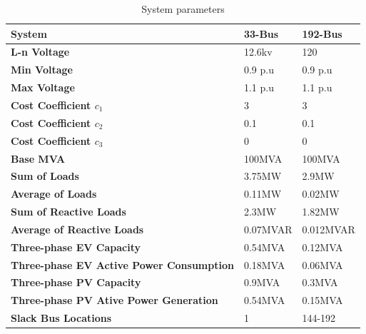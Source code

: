 \documentclass[journal]{IEEEtran}
\begin{document}
\begin{table}
\begin{center}
\caption{System parameters}
\label{table2}
\begin{tabular}{ |p{3.5cm}|p{2cm}|p{2cm}| }
\hline
 \textbf{System} & \textbf{33-Bus} & \textbf{192-Bus} \\ 
 \hline\hline
 \textbf{L-n Voltage} & 12.6kv & 120 \\
 \hline
 \textbf{Min Voltage} & 0.9 p.u & 0.9 p.u\\
 \hline
 \textbf{Max Voltage} & 1.1 p.u & 1.1 p.u\\
 \hline
 \textbf{Cost Coefficient $c_{1}$} & 3 & 3 \\
 \hline
 \textbf{Cost Coefficient $c_{2}$} & 0.1 & 0.1 \\
 \hline
 \textbf{Cost Coefficient $c_{3}$} & 0 & 0 \\
 \hline
 \textbf{Base MVA} & 100MVA & 100MVA \\
 \hline
 \textbf{Sum of Loads} & 3.75MW & 2.9MW \\
 \hline
 \textbf{Average of Loads} & 0.11MW & 0.02MW \\
 \hline
 \textbf{Sum of Reactive Loads} & 2.3MW & 1.82MW \\
 \hline
 \textbf{Average of Reactive Loads} & 0.07MVAR & 0.012MVAR \\
 \hline
 

{\textbf{Three-phase EV Capacity}}& 0.54MVA& 0.12MVA \\

\hline
{\textbf{Three-phase EV Active Power Consumption}}& 0.18MVA& 0.06MVA\\
\hline

{\textbf{Three-phase PV Capacity}}& 0.9MVA& 0.3MVA\\
\hline
{\textbf{Three-phase PV Ative Power Generation}}& 0.54MVA& 0.15MVA\\


\hline





 
 {\textbf{Slack Bus Locations}}& 1 & 144-192\\
 
 \hline
 
\end{tabular}
\footnotetext{$^*$ }\\
\end{center}

\end{table}
\end{document}
